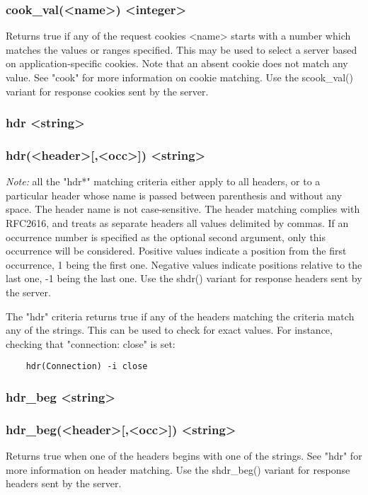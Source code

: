\subsubsection[cook\_val]{cook\_val(<name>) <integer>}
  Returns true if any of the request cookies <name> starts with a number which
  matches the values or ranges specified. This may be used to select a server
  based on application-specific cookies. Note that an absent cookie does not
  match any value. See "cook" for more information on cookie matching. Use the
  scook\_val() variant for response cookies sent by the server.

\subsubsection[hdr]{hdr <string>}
\subsubsection*{hdr(<header>[,<occ>]) <string>}
  \emph{Note:} all the "hdr*" matching criteria either apply to all headers, or to a
  particular header whose name is passed between parenthesis and without any
  space. The header name is not case-sensitive. The header matching complies
  with RFC2616, and treats as separate headers all values delimited by commas.
  If an occurrence number is specified as the optional second argument, only
  this occurrence will be considered. Positive values indicate a position from
  the first occurrence, 1 being the first one. Negative values indicate
  positions relative to the last one, -1 being the last one. Use the shdr()
  variant for response headers sent by the server.

  The "hdr" criteria returns true if any of the headers matching the criteria
  match any of the strings. This can be used to check for exact values. For
  instance, checking that "connection: close" is set:
  \begin{verbatim}
    hdr(Connection) -i close
  \end{verbatim}
     
\subsubsection[hdr\_beg]{hdr\_beg <string>}
\subsubsection{hdr\_beg(<header>[,<occ>]) <string>}
  Returns true when one of the headers begins with one of the strings. See
  "hdr" for more information on header matching. Use the shdr\_beg() variant for
  response headers sent by the server.

